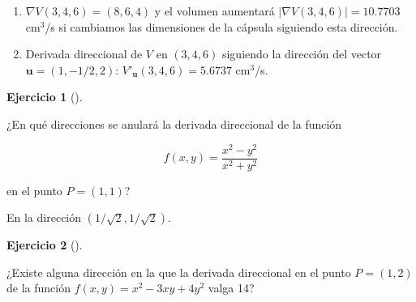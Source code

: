 \documentclass[
  a4paper,
]{scrreport}
\theoremstyle{definition}
\newtheorem{exercise}{Ejercicio}[chapter]
\theoremstyle{remark}
\begin{document}
\begin{tcolorbox}[enhanced jigsaw, toprule=.15mm, bottomrule=.15mm, coltitle=black, toptitle=1mm, breakable, left=2mm, arc=.35mm, title=\textcolor{quarto-callout-tip-color}{\faLightbulb}\hspace{0.5em}{Solución}, titlerule=0mm, colback=white, colbacktitle=quarto-callout-tip-color!10!white, colframe=quarto-callout-tip-color-frame, bottomtitle=1mm, rightrule=.15mm, leftrule=.75mm, opacitybacktitle=0.6, opacityback=0]

\begin{enumerate}
\def\labelenumi{\alph{enumi}.}
\item
  \(\nabla V(3,4,6)=(8,6,4)\) y el volumen aumentará
  \(|\nabla V(3,4,6)|=10.7703\) cm\(^3\)/s si cambiamos las dimensiones
  de la cápsula siguiendo esta dirección.
\item
  Derivada direccional de \(V\) en \((3,4,6)\) siguiendo la dirección
  del vector \(\mathbf{u}=(1,-1/2,2)\): \(V'_\mathbf{u}(3,4,6)=5.6737\)
  cm\(^3\)/s.
\end{enumerate}

\end{tcolorbox}

\begin{exercise}[]\protect\hypertarget{exr-derivada-direccional-nula}{}\label{exr-derivada-direccional-nula}

¿En qué direcciones se anulará la derivada direccional de la función

\[
f(x,y)=\frac{x^2-y^2}{x^2+y^2}
\]

en el punto \(P=(1,1)\)?

\end{exercise}

\begin{tcolorbox}[enhanced jigsaw, toprule=.15mm, bottomrule=.15mm, coltitle=black, toptitle=1mm, breakable, left=2mm, arc=.35mm, title=\textcolor{quarto-callout-tip-color}{\faLightbulb}\hspace{0.5em}{Solución}, titlerule=0mm, colback=white, colbacktitle=quarto-callout-tip-color!10!white, colframe=quarto-callout-tip-color-frame, bottomtitle=1mm, rightrule=.15mm, leftrule=.75mm, opacitybacktitle=0.6, opacityback=0]

En la dirección \((1/\sqrt{2},1/\sqrt{2})\).

\end{tcolorbox}

\begin{exercise}[]\protect\hypertarget{exr-derivada-direccional}{}\label{exr-derivada-direccional}

¿Existe alguna dirección en la que la derivada direccional en el punto
\(P=(1,2)\) de la función \(f(x,y) = x^2-3xy+4y^2\) valga 14?

\end{exercise}
\end{document}
